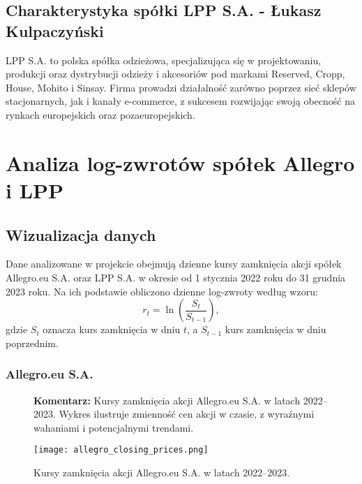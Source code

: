 \documentclass[12pt]{article}
\begin{document}
\subsection{Charakterystyka spółki LPP S.A. - Łukasz Kulpaczyński}
LPP S.A. to polska spółka odzieżowa, specjalizująca się w projektowaniu, produkcji oraz dystrybucji odzieży i akcesoriów pod markami Reserved, Cropp, House, Mohito i Sinsay. Firma prowadzi działalność zarówno poprzez sieć sklepów stacjonarnych, jak i kanały e-commerce, z sukcesem rozwijając swoją obecność na rynkach europejskich oraz pozaeuropejskich.



\section{Analiza log-zwrotów spółek Allegro i LPP}

\subsection{Wizualizacja danych}

Dane analizowane w projekcie obejmują dzienne kursy zamknięcia akcji spółek Allegro.eu S.A. oraz LPP S.A. w okresie od 1 stycznia 2022 roku do 31 grudnia 2023 roku. Na ich podstawie obliczono dzienne log-zwroty według wzoru:
    \[
    r_t = \ln\left(\frac{S_t}{S_{t-1}}\right),
    \]
gdzie \( S_t \) oznacza kurs zamknięcia w dniu \( t \), a \( S_{t-1} \) kurs zamknięcia w dniu poprzednim.

\subsubsection{Allegro.eu S.A.}

\begin{figure}[H]
    \centering
    \begin{minipage}[t]{0.45\textwidth}
        \vspace{-5cm} 
        \justifying
        \textbf{Komentarz:} Kursy zamknięcia akcji Allegro.eu S.A. w latach 2022–2023. 
        Wykres ilustruje zmienność cen akcji w czasie, z wyraźnymi wahaniami i potencjalnymi trendami.
    \end{minipage}%
    \hfill
    \begin{minipage}[t]{0.45\textwidth}
        \centering
        \texttt{[image: allegro\_closing\_prices.png]}
        \caption{Kursy zamknięcia akcji Allegro.eu S.A. w latach 2022–2023.}
        \label{fig:allegro_closing_prices}
    \end{minipage}
\end{figure}
\end{document}
